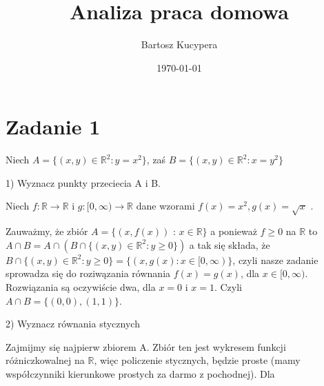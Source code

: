 \documentclass{article}
\title{Analiza praca domowa}
\author{Bartosz Kucypera}
\date{\today}
\begin{document}
\maketitle

\section*{Zadanie 1} 
Niech $A = \{(x, y) \in \mathbb{R}^2 : y = x^2 \}$, zaś $ B = \{(x, y) \in \mathbb{R}^2 : x = y^2 \}$ \newline

1) Wyznacz punkty przeciecia A i B. \newline

Niech $f: \mathbb{R} \rightarrow \mathbb{R} $ i $g: [0, \infty ) \rightarrow \mathbb{R}$ dane wzorami $f(x) = x^2, g(x) = \sqrt{x}$ . \newline 

Zauważmy, że zbiór $ A = \{(x, f(x))$ : $x \in \mathbb{R} \} $ a ponieważ \newline $f \ge 0$ na $\mathbb{R}$ to $A \cap B = A \cap \displaystyle \left(B \cap \{ (x, y) \in \mathbb{R}^2 : y \ge 0 \}\right)$ \newline a tak się składa, że 
$B \cap \{ (x, y) \in \mathbb{R}^2 : y \ge 0 \} = \{(x, g(x):x \in [0,\infty) \}$, \newline
czyli nasze zadanie sprowadza się do roziwązania równania $f(x) = g(x)$, dla $x\in [0, \infty)$. \newline 
Rozwiązania są oczywiście dwa, dla $x = 0$ i $x = 1$.
Czyli $A \cap B = \{(0, 0), (1, 1) \}$.

2) Wyznacz równania stycznych

Zajmijmy się najpierw zbiorem A. Zbiór ten jest wykresem funkcji różniczkowalnej na $\mathbb{R}$,
więc policzenie stycznych, będzie proste (mamy współczynniki kierunkowe prostych za darmo z pochodnej). Dla 
\end{document}
